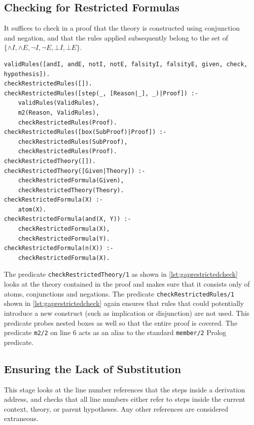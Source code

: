 \documentclass[11pt,twoside,a4paper]{report}
\begin{document}
\subsection{Checking for Restricted Formulas}
It suffices to check in a proof that the theory is constructed using conjunction and negation, and that the rules applied subsequently belong to the set of $\{\wedge I, \wedge E, \neg I, \neg E, \bot I, \bot E\}$.

\begin{lstlisting}[caption={Checking whether a proof uses only conjunction and negation},label=lst:gaprestrictedcheck]
% Checks to see if the proof consists of ruleset defined over argumentation logic
validRules([andI, andE, notI, notE, falsityI, falsityE, given, check, hypothesis]).
checkRestrictedRules([]).
checkRestrictedRules([step(_, [Reason|_], _)|Proof]) :- 
	validRules(ValidRules), 
	m2(Reason, ValidRules), 
	checkRestrictedRules(Proof).
checkRestrictedRules([box(SubProof)|Proof]) :-
	checkRestrictedRules(SubProof),
	checkRestrictedRules(Proof).
checkRestrictedTheory([]).
checkRestrictedTheory([Given|Theory]) :-
	checkRestrictedFormula(Given),
	checkRestrictedTheory(Theory).
checkRestrictedFormula(X) :- 
	atom(X).
checkRestrictedFormula(and(X, Y)) :-
	checkRestrictedFormula(X),
	checkRestrictedFormula(Y).
checkRestrictedFormula(n(X)) :-
	checkRestrictedFormula(X).
\end{lstlisting}

The predicate \lstinline$checkRestrictedTheory/1$ as shown in \autoref{lst:gaprestrictedcheck} looks at the theory contained in the proof and makes sure that it consists only of atoms, conjunctions and negations. The predicate \lstinline$checkRestrictedRules/1$ shown in \autoref{lst:gaprestrictedcheck} again ensures that rules that could potentially introduce a new construct (such as implication or disjunction) are not used. This predicate probes nested boxes as well so that the entire proof is covered. The predicate \lstinline$m2/2$ on line 6 acts as an alias to the standard \lstinline$member/2$ Prolog predicate.

\subsection{Ensuring the Lack of Substitution}
This stage looks at the line number references that the steps inside a derivation address, and checks that all line numbers either refer to steps inside the current context, theory, or parent hypotheses. Any other references are considered extraneous.
\end{document}
